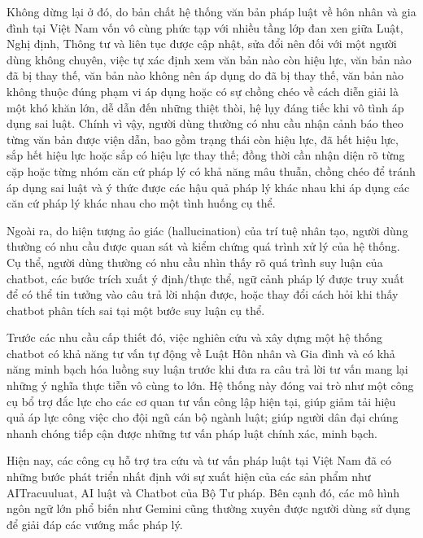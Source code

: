 \documentclass[../DoAn.tex]{subfiles}
\begin{document}
Không dừng lại ở đó, do bản chất hệ thống văn bản pháp luật về hôn nhân và gia đình tại Việt Nam vốn vô cùng phức tạp với nhiều tầng lớp đan xen giữa Luật, Nghị định, Thông tư và liên tục được cập nhật, sửa đổi nên đối với một người dùng không chuyên, việc tự xác định xem văn bản nào còn hiệu lực, văn bản nào đã bị thay thế, văn bản nào không nên áp dụng do đã bị thay thế, văn bản nào không thuộc đúng phạm vi áp dụng hoặc có sự chồng chéo về cách diễn giải là một khó khăn lớn, dễ dẫn đến những thiệt thòi, hệ lụy đáng tiếc khi vô tình áp dụng sai luật. Chính vì vậy, người dùng thường có nhu cầu nhận cảnh báo theo từng văn bản được viện dẫn, bao gồm trạng thái còn hiệu lực, đã hết hiệu lực, sắp hết hiệu lực hoặc sắp có hiệu lực thay thế; đồng thời cần nhận diện rõ từng cặp hoặc từng nhóm căn cứ pháp lý có khả năng mâu thuẫn, chồng chéo để tránh áp dụng sai luật và ý thức được các hậu quả pháp lý khác nhau khi áp dụng các căn cứ pháp lý khác nhau cho một tình huống cụ thể.


Ngoài ra, do hiện tượng ảo giác (hallucination) của trí tuệ nhân tạo, người dùng thường có nhu cầu được quan sát và kiểm chứng quá trình xử lý của hệ thống. Cụ thể, người dùng thường có nhu cầu nhìn thấy rõ quá trình suy luận của chatbot, các bước trích xuất ý định/thực thể, ngữ cảnh pháp lý được truy xuất để có thể tin tưởng vào câu trả lời nhận được, hoặc thay đổi cách hỏi khi thấy chatbot phân tích sai tại một bước suy luận cụ thể.


Trước các nhu cầu cấp thiết đó, việc nghiên cứu và xây dựng một hệ thống chatbot có khả năng tư vấn tự động về Luật Hôn nhân và Gia đình và có khả năng minh bạch hóa luồng suy luận trước khi đưa ra câu trả lời tư vấn mang lại những ý nghĩa thực tiễn vô cùng to lớn. Hệ thống này đóng vai trò như một công cụ bổ trợ đắc lực cho các cơ quan tư vấn công lập hiện tại, giúp giảm tải hiệu quả áp lực công việc cho đội ngũ cán bộ ngành luật; giúp người dân đại chúng nhanh chóng tiếp cận được những tư vấn pháp luật chính xác, minh bạch.


Hiện nay, các công cụ hỗ trợ tra cứu và tư vấn pháp luật tại Việt Nam đã có những bước phát triển nhất định với sự xuất hiện của các sản phẩm như AITracuuluat, AI luật và Chatbot của Bộ Tư pháp. Bên cạnh đó, các mô hình ngôn ngữ lớn phổ biến như Gemini cũng thường xuyên được người dùng sử dụng để giải đáp các vướng mắc pháp lý.
\end{document}

